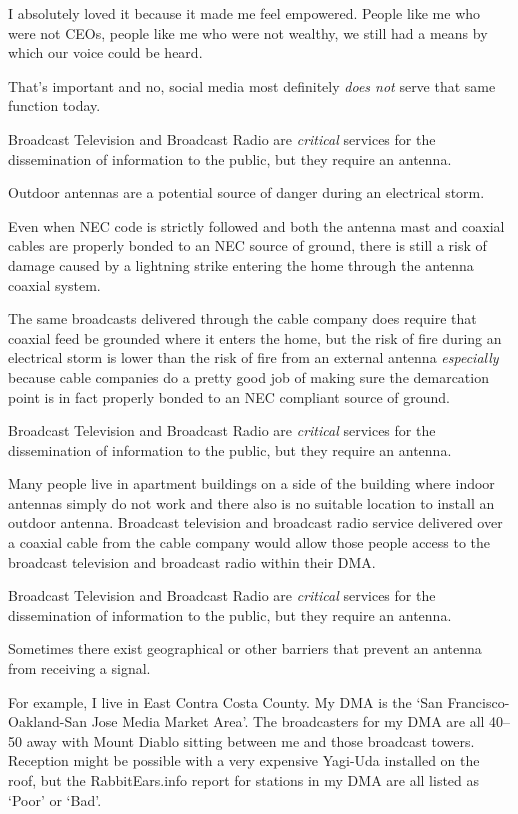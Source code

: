 I absolutely loved it because it made me feel empowered. People like me who were not CEOs, people
like me who were not wealthy, we still had a means by which our voice could be heard.

That's important and no, social media most definitely \emph{does not} serve that same function
today.

Broadcast Television and Broadcast Radio are \emph{critical} services for the dissemination of
information to the public, but they require an antenna.

Outdoor antennas are a potential source of danger during an electrical storm.

Even when NEC code is strictly followed and both the antenna mast and coaxial cables are properly
bonded to an NEC source of ground, there is still a risk of damage caused by a lightning strike
entering the home through the antenna coaxial system.

The same broadcasts delivered through the cable company does require that coaxial feed be grounded
where it enters the home, but the risk of fire during an electrical storm is lower than the risk
of fire from an external antenna \emph{especially} because cable companies do a pretty good job of
making sure the demarcation point is in fact properly bonded to an NEC compliant source of ground.

Broadcast Television and Broadcast Radio are \emph{critical} services for the dissemination of
information to the public, but they require an antenna.

Many people live in apartment buildings on a side of the building where indoor antennas simply
do not work and there also is no suitable location to install an outdoor antenna. Broadcast
television and broadcast radio service delivered over a coaxial cable from the cable company
would allow those people access to the broadcast television and broadcast radio within their
DMA.

Broadcast Television and Broadcast Radio are \emph{critical} services for the dissemination of
information to the public, but they require an antenna.

Sometimes there exist geographical or other barriers that prevent an antenna from receiving
a signal.

For example, I live in East Contra Costa County. My DMA is the `San Francisco-Oakland-San Jose
Media Market Area'. The broadcasters for my DMA are all \qtyrange{40}{50}{\mile} away with
Mount Diablo sitting between me and those broadcast towers. Reception might be possible with
a very expensive Yagi-Uda installed on the roof, but the RabbitEars.info report for stations
in my DMA are all listed as `Poor' or `Bad'.

